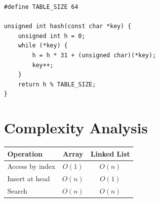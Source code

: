 \documentclass[11pt,a4paper]{article}
\begin{document}
\begin{lstlisting}
#define TABLE_SIZE 64

unsigned int hash(const char *key) {
    unsigned int h = 0;
    while (*key) {
        h = h * 31 + (unsigned char)(*key);
        key++;
    }
    return h % TABLE_SIZE;
}
\end{lstlisting}

\section{Complexity Analysis}
\begin{center}
\begin{tabular}{lcc}
\hline
\textbf{Operation} & \textbf{Array} & \textbf{Linked List} \\
\hline
Access by index & $O(1)$ & $O(n)$ \\
Insert at head  & $O(n)$ & $O(1)$ \\
Search          & $O(n)$ & $O(n)$ \\
\hline
\end{tabular}
\end{center}
\end{document}
